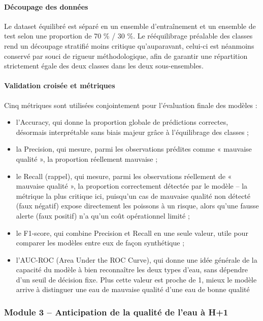 \documentclass[a4paper,12pt, oneside]{article}
\begin{document}
\paragraph{Découpage des données\\}
Le dataset équilibré est séparé en un ensemble d'entraînement et un ensemble de test selon une proportion de 70 \% / 30 \%. Le rééquilibrage préalable des classes rend un découpage stratifié moins critique qu'auparavant, celui-ci est néanmoins conservé par souci de rigueur méthodologique, afin de garantir une répartition strictement égale des deux classes dans les deux sous-ensembles.

\paragraph{Validation croisée et métriques\\}
Cinq métriques sont utilisées conjointement pour l'évaluation finale des modèles :
\begin{itemize}
    \item l'Accuracy, qui donne la proportion globale de prédictions correctes, désormais interprétable sans biais majeur grâce à l'équilibrage des classes ;
    \item la Precision, qui mesure, parmi les observations prédites comme « mauvaise qualité », la proportion réellement mauvaise ;
    \item le Recall (rappel), qui mesure, parmi les observations réellement de « mauvaise qualité », la proportion correctement détectée par le modèle -- la métrique la plus critique ici, puisqu'un cas de mauvaise qualité non détecté (faux négatif) expose directement les poissons à un risque, alors qu'une fausse alerte (faux positif) n'a qu'un coût opérationnel limité ;
    \item le F1-score, qui combine Precision et Recall en une seule valeur, utile pour comparer les modèles entre eux de façon synthétique ;
    \item l'AUC-ROC (Area Under the ROC Curve), qui donne une idée générale de la capacité du modèle à bien reconnaître les deux types d'eau, sans dépendre d'un seuil de décision fixe. Plus cette valeur est proche de 1, mieux le modèle arrive à distinguer une eau de mauvaise qualité d'une eau de bonne qualité
\end{itemize}

\subsubsection[Module 3]{Module 3 -- Anticipation de la qualité de l'eau à H+1\\}
\end{document}
